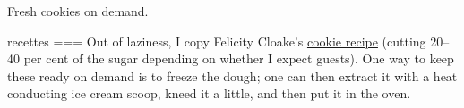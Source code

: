 Fresh cookies on demand.

recettes
===
Out of laziness, I copy Felicity Cloake’s \href{https://www.theguardian.com/food/2025/jun/15/how-to-make-chocolate-chip-cookies-recipe-felicity-cloake}{cookie recipe} (cutting 20–40 per cent of the sugar depending on whether I expect guests). One way to keep these ready on demand is to freeze the dough; one can then extract it with a heat conducting ice cream scoop, kneed it a little, and then put it in the oven.